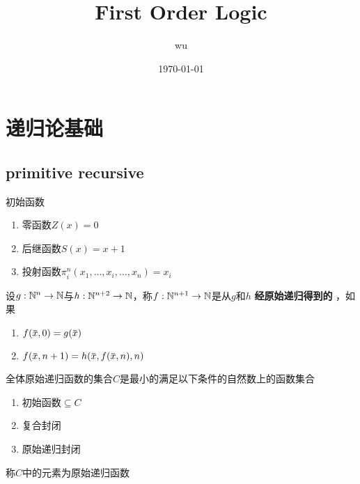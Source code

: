\documentclass[11pt]{article}
\author{wu}
\date{\today}
\title{First Order Logic}
\begin{document}
\maketitle
\tableofcontents

\section{递归论基础}
\label{sec:org316feae}
\subsection{primitive recursive}
\label{sec:org1d6c484}
\begin{definition}[]
初始函数
\begin{enumerate}
\item 零函数\(Z(x)=0\)
\item 后继函数\(S(x)=x+1\)
\item 投射函数\(\pi_i^n(x_1,\dots,x_i,\dots,x_n)=x_i\)
\end{enumerate}
\end{definition}

\begin{definition}[]
设\(g:\mathbb{N}^n\to\mathbb{N}\)与\(h:\mathbb{N}^{n+2}\to\mathbb{N}\)，称\(f:\mathbb{N}^{n+1}\to\mathbb{N}\)是从\(g\)和\(h\) \textbf{经原始递归得到的} ，如果
\begin{enumerate}
\item \(f(\barx,0)=g(\barx)\)
\item \(f(\barx,n+1)=h(\barx,f(\barx,n),n)\)
\end{enumerate}
\end{definition}

\begin{definition}[]
全体原始递归函数的集合\(C\)是最小的满足以下条件的自然数上的函数集合
\begin{enumerate}
\item 初始函数\(\subseteq C\)
\item 复合封闭
\item 原始递归封闭
\end{enumerate}


称\(C\)中的元素为原始递归函数
\end{definition}
\end{document}
